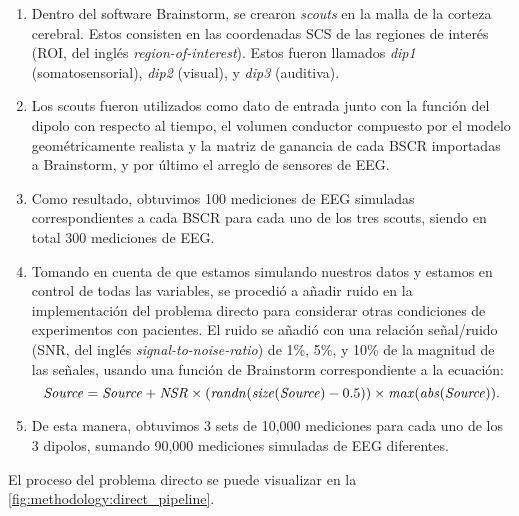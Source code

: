 \begin{enumerate}
	\item Dentro del software Brainstorm, se crearon \emph{scouts} en la malla de la corteza cerebral. Estos consisten en las coordenadas SCS de las regiones de interés (ROI, del inglés \emph{region-of-interest}). Estos fueron llamados \emph{dip1} (somatosensorial), \emph{dip2} (visual), y \emph{dip3} (auditiva).
	\item Los scouts fueron utilizados como dato de entrada junto con la función del dipolo con respecto al tiempo, el volumen conductor compuesto por el modelo geométricamente realista y la matriz de ganancia de cada BSCR importadas a Brainstorm, y por último el arreglo de sensores de EEG.
	\item Como resultado, obtuvimos 100 mediciones de EEG simuladas correspondientes a cada BSCR para cada uno de los tres scouts, siendo en total 300 mediciones de EEG.
	\item Tomando en cuenta de que estamos simulando nuestros datos y estamos en control de todas las variables, se procedió a añadir ruido en la implementación del problema directo para considerar otras condiciones de experimentos con pacientes. El ruido se añadió con una relación señal/ruido (SNR, del inglés \emph{signal-to-noise-ratio}) de 1\%, 5\%, y 10\% de la magnitud de las señales, usando una función de Brainstorm correspondiente a la ecuación: 
	\begin{equation}
		\label{eq:snr}
		\text{\emph{Source}} = \text{\emph{Source}} + \text{\emph{NSR}}\times(\text{\emph{randn}}(\text{\emph{size}}(\text{\emph{Source}})-0.5)) \times \text{\emph{max}}(\text{\emph{abs}}(\text{\emph{Source}}))\text{.}
	\end{equation}
	\item De esta manera, obtuvimos 3 sets de 10,000 mediciones para cada uno de los 3 dipolos, sumando 90,000 mediciones simuladas de EEG diferentes.
\end{enumerate}

El proceso del problema directo se puede visualizar en la \cref{fig:methodology:direct_pipeline}.

